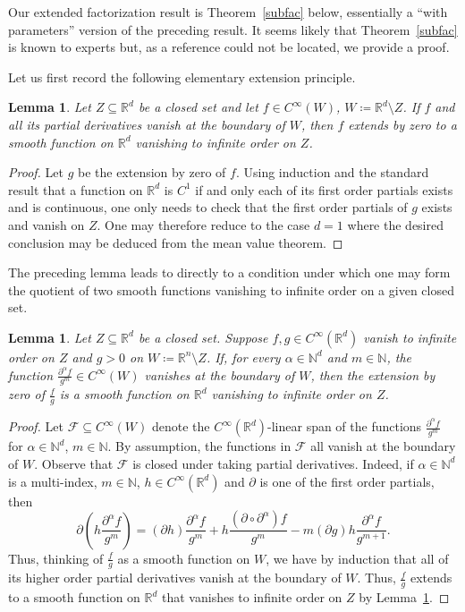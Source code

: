 \documentclass[12pt]{article}
\theoremstyle{plain}
\newtheorem{lemma}[thm]{Lemma}
\theoremstyle{definition}
\newcommand{\R}{\mathbb{R}}
\newcommand{\N}{\mathbb{N}}
\numberwithin{equation}{section}
\begin{document}
Our extended factorization result is Theorem~\ref{subfac} below, essentially a ``with parameters'' version of the preceding result. It seems likely that Theorem~\ref{subfac} is known to experts but, as a reference could not be located, we provide a proof.








 Let us first record the following elementary extension principle.


\begin{lemma}\label{elemext}
Let $Z \subseteq \R^d$ be a closed set and let $f \in C^\infty(W)$,  $W \coloneqq \R^d \setminus Z$. If $f$ and all its partial derivatives vanish at the boundary of $W$, then $f$ extends by zero to a smooth function on $\R^d$ vanishing to infinite order  on $Z$. 
\end{lemma}
\begin{proof}
Let $g$ be the extension by zero of $f$. 
Using induction and the standard result that a function on $\R^d$ is $C^1$ if and only each of its first order partials exists and is continuous, one only needs to check that the first order partials of $g$ exists and vanish on $Z$. One may therefore reduce to the case $d=1$ where the desired conclusion may be deduced from the mean value theorem. 
\end{proof}


 The preceding lemma leads to directly to a condition under which one may form the quotient of two smooth functions vanishing to infinite order on a given closed set. 


\begin{lemma}\label{elemquot}
Let $Z \subseteq \R^d$ be a closed set. Suppose  $f , g \in C^\infty(\R^d)$ vanish to infinite order on $Z$  and $g >0$  on $W\coloneqq \R^n \setminus Z$. If, for every $\alpha \in \N^d$ and $m \in \N$, the function $\frac{\partial^\alpha f}{g^m} \in C^\infty(W)$  vanishes at the boundary of $W$, then the extension by zero of $\frac{f}{g}$ is a smooth function on $\R^d$ vanishing to infinite order on $Z$. 
\end{lemma}


\begin{proof}
Let $\mathscr{F} \subseteq C^\infty(W)$ denote the  $C^\infty(\R^d)$-linear span of the functions $\frac{\partial^\alpha f}{g^m}$ for $\alpha \in \N^d$, $m \in \N$. By assumption, the functions in $\mathscr{F}$ all vanish at the boundary of $W$. Observe that $\mathscr{F}$ is closed under taking partial derivatives. Indeed, if $\alpha \in \N^d$ is a multi-index, $m \in \N$, $h \in C^\infty(\R^d)$ and $\partial$ is one of the first order partials, then 
\[ \partial ( h \frac{\partial^\alpha f}{g^m} )= (\partial h) \frac{\partial^\alpha f}{g^m} + h \frac{(\partial \circ \partial^\alpha) f}{g^m} - m(\partial g)h \frac{\partial^\alpha f}{g^{m+1}}.\]
Thus, thinking of $\frac{f}{g}$ as a smooth function on $W$,  we have by induction that all of its higher order partial derivatives vanish at the boundary of $W$. Thus,  $\frac{f}{g}$ extends to a smooth function on $\R^d$ that vanishes to infinite order on $Z$ by  Lemma~\ref{elemext}.
 \end{proof}
\end{document}
